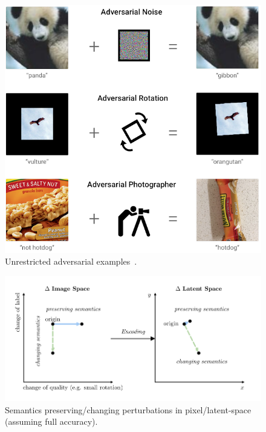 \documentclass[a4paper, oneside]{discothesis}
\begin{document}
\begin{figure}
	\centering
	\includegraphics[width=0.75\columnwidth]{figures/unrestricted-advx.png}
	\caption{Unrestricted adversarial examples~\cite{brown2018unrestricted}.}
	\label{fig:unrestricted}
\end{figure}

\begin{figure}
	\centering
	\includegraphics[width=1\columnwidth]{figures/latentspace.pdf}
	\caption{Semantics preserving/changing perturbations in pixel/latent-space (assuming full accuracy).}
	\label{fig:latentspace}
\end{figure}
\end{document}
